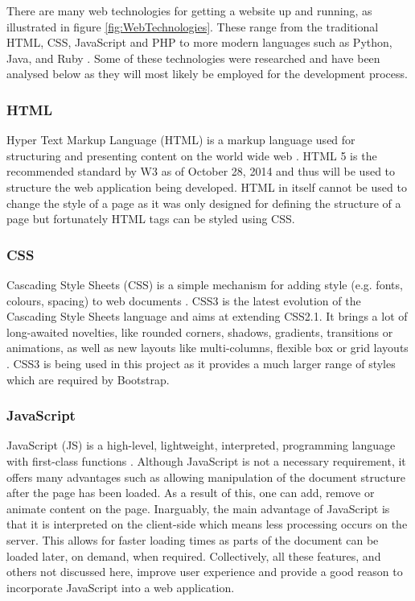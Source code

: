 There are many web technologies for getting a website up and running, as illustrated in figure \ref{fig:WebTechnologies}. These range from the traditional HTML, CSS, JavaScript and PHP to more modern languages such as Python, Java, and Ruby \cite{Differential:WebTechnologies}. Some of these technologies were researched and have been analysed below as they will most likely be employed for the development process.

\subsubsection{HTML} 
Hyper Text Markup Language (HTML) is a markup language used for structuring and presenting content on the world wide web \cite{W3:HTML5}. HTML 5 is the recommended standard by W3 as of October 28, 2014 and thus will be used to structure the web application being developed. HTML in itself cannot be used to change the style of a page as it was only designed for defining the structure of a page but fortunately HTML tags can be styled using CSS.

\subsubsection{CSS} 
Cascading Style Sheets (CSS) is a simple mechanism for adding style (e.g. fonts, colours, spacing) to web documents \cite{W3:CSS}. CSS3 is the latest evolution of the Cascading Style Sheets language and aims at extending CSS2.1. It brings a lot of long-awaited novelties, like rounded corners, shadows, gradients, transitions or animations, as well as new layouts like multi-columns, flexible box or grid layouts \cite{Mozilla:CSS3}. CSS3 is being used in this project as it provides a much larger range of styles which are required by Bootstrap.

\subsubsection{JavaScript}
JavaScript (JS) is a high-level, lightweight, interpreted, programming language with first-class functions \cite{Mozilla:JavaScript}. Although JavaScript is not a necessary requirement, it offers many advantages such as allowing manipulation of the document structure after the page has been loaded. As a result of this, one can add, remove or animate content on the page. Inarguably, the main advantage of JavaScript is that it is interpreted on the client-side which means less processing occurs on the server. This allows for faster loading times as parts of the document can be loaded later, on demand, when required. Collectively, all these features, and others not discussed here, improve user experience and provide a good reason to incorporate JavaScript into a web application.

